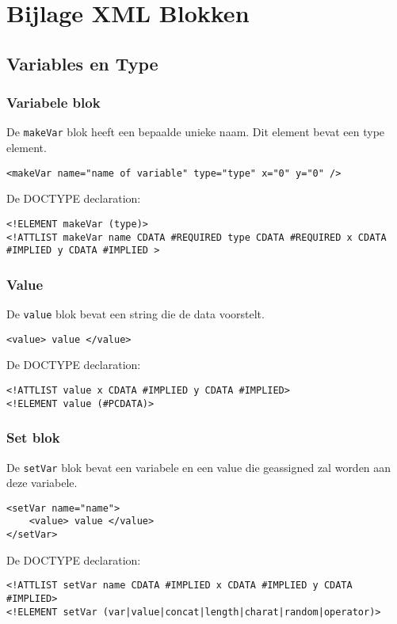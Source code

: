 \documentclass[]{article}
\begin{document}
\section{Bijlage XML Blokken}
\label{bijlagexml}
\subsection{Variables en Type}

\subsubsection{Variabele blok}
De \texttt{makeVar} blok heeft een bepaalde unieke naam.	
Dit element bevat een type element.
\lstset{language=XML}
\begin{lstlisting}
<makeVar name="name of variable" type="type" x="0" y="0" />
\end{lstlisting}
De DOCTYPE declaration: 
\lstset{language=XML}
\begin{lstlisting}
<!ELEMENT makeVar (type)>
<!ATTLIST makeVar name CDATA #REQUIRED type CDATA #REQUIRED x CDATA #IMPLIED y CDATA #IMPLIED >
\end{lstlisting}

\subsubsection{Value}
De \texttt{value} blok bevat een string die de data voorstelt. 
\lstset{language=XML}
\begin{lstlisting}
<value> value </value>
\end{lstlisting}
De DOCTYPE declaration: 
\lstset{language=XML}
\begin{lstlisting}
<!ATTLIST value x CDATA #IMPLIED y CDATA #IMPLIED>
<!ELEMENT value (#PCDATA)>
\end{lstlisting}

\subsubsection{Set blok}
De \texttt{setVar} blok bevat een variabele en een value die geassigned zal worden aan deze variabele.
\lstset{language=XML}
\begin{lstlisting}
<setVar name="name">
	<value> value </value>
</setVar>
\end{lstlisting}
De DOCTYPE declaration: 
\lstset{language=XML}
\begin{lstlisting}
<!ATTLIST setVar name CDATA #IMPLIED x CDATA #IMPLIED y CDATA #IMPLIED>
<!ELEMENT setVar (var|value|concat|length|charat|random|operator)>
\end{lstlisting}
\end{document}
